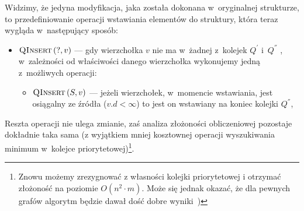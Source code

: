 Widzimy, że jedyna modyfikacja, jaka została dokonana w~oryginalnej strukturze, to przedefiniowanie operacji wstawiania elementów do struktury, która teraz wygląda w~następujący sposób:

\begin{itemize}
\item $\textrm{\textsc{QInsert}} \left( ?, v \right)$ --- gdy wierzchołka $v$ nie ma w~żadnej z~kolejek $Q^{'}$ i~$Q^{''}$ , w~zależności od właściwości danego wierzchołka wykonujemy jedną z~możliwych operacji:
\begin{itemize}
\item $\textrm{\textsc{QInsert}} \left( S, v \right) $ --- jeżeli wierzchołek, w~momencie wstawiania, jest osiągalny ze źródła ($v.d < \infty$) to jest on wstawiany na koniec kolejki $Q^{''}$,
\end{itemize}
\end{itemize}

Reszta operacji nie ulega zmianie, zaś analiza złożoności obliczeniowej pozostaje dokładnie taka sama (z wyjątkiem mniej kosztownej operacji wyszukiwania minimum w~kolejce priorytetowej)\footnote{Znowu możemy zrezygnować z własności kolejki priorytetowej i otrzymać złożoność na poziomie $O \left( n^{2} \cdot m \right)$. Może się jednak okazać, że dla pewnych grafów algorytm będzie dawał dość dobre wyniki~\cite[$3.10.2$]{Dissertation})}.

